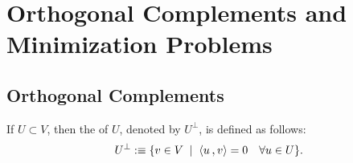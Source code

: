 \section{Orthogonal Complements and Minimization Problems}
\subsection{Orthogonal Complements}

\begin{mydef}
  If $U\subset V$, then the  of $U$, denoted by $U^{\bot}$, is defined as follows:
  \begin{equation}
    U^{\bot} :\equiv \{v \in V \; \mid \; \ip{u}{v} = 0 \quad \forall u \in U \}.
  \end{equation}
\end{mydef}

